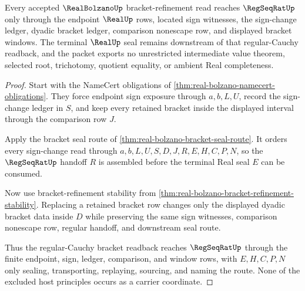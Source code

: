 \begin{theorem}
\label{thm:real-bolzano-regular-cauchy-bracket-readback}
Every accepted $\RealBolzanoUp$ bracket-refinement read reaches $\RegSeqRatUp$ only through the endpoint $\RealUp$ rows, located sign witnesses, the sign-change ledger, dyadic bracket ledger, comparison nonescape row, and displayed bracket windows. The terminal $\RealUp$ seal remains downstream of that regular-Cauchy readback, and the packet exports no unrestricted intermediate value theorem, selected root, trichotomy, quotient equality, or ambient Real completeness.
\end{theorem}
\begin{proof}
Start with the NameCert obligations of \autoref{thm:real-bolzano-namecert-obligations}. They force endpoint sign exposure through $a,b,L,U$, record the sign-change ledger in $S$, and keep every retained bracket inside the displayed interval through the comparison row $J$.

Apply the bracket seal route of \autoref{thm:real-bolzano-bracket-seal-route}. It orders every sign-change read through $a,b,L,U,S,D,J,R,E,H,C,P,N$, so the $\RegSeqRatUp$ handoff $R$ is assembled before the terminal Real seal $E$ can be consumed.

Now use bracket-refinement stability from \autoref{thm:real-bolzano-bracket-refinement-stability}. Replacing a retained bracket row changes only the displayed dyadic bracket data inside $D$ while preserving the same sign witnesses, comparison nonescape row, regular handoff, and downstream seal route.

Thus the regular-Cauchy bracket readback reaches $\RegSeqRatUp$ through the finite endpoint, sign, ledger, comparison, and window rows, with $E,H,C,P,N$ only sealing, transporting, replaying, sourcing, and naming the route. None of the excluded host principles occurs as a carrier coordinate.
\end{proof}

